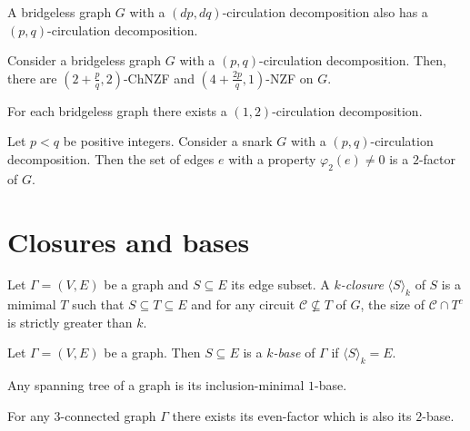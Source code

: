 \begin{lemma}
A bridgeless graph $G$ with a $(dp,dq)$-circulation decomposition also has a $(p,q)$-circulation decomposition.\label{lem:circ_rel_prime}
\end{lemma}

\begin{proposition}
    Consider a bridgeless graph $G$ with a $(p,q)$-circulation decomposition. Then, there are $\left(2+\frac pq,2\right)$-ChNZF and $\left(4+\frac {2p}q, 1\right)$-NZF on $G$.\label{prop:nzf_from_two_circulations_generalised}
\end{proposition}

\begin{conjecture}
    For each bridgeless graph there exists a $(1, 2)$-circulation decomposition.
\end{conjecture}

\begin{lemma}
	Let $p<q$ be positive integers. Consider a snark $G$ with a $(p,q)$-circulation decomposition. Then the set of edges $e$ with a property $\varphi_2(e)\neq 0$ is a $2$-factor of $G$.\label{lem:2_circ_snark_2_factor}
\end{lemma}

\section{Closures and bases}

\begin{definition} \cite[p. 132]{seymour}
	Let $\Gamma=(V,E)$ be a graph and $S\subseteq E$ its edge subset. A \emph{$k$-closure} $\langle S\rangle_{k}$ of $S$ is a mimimal $T$ such that $S\subseteq T\subseteq E$ and for any circuit $\mathcal C\not\subseteq T$ of $G$, the size of $\mathcal C\cap T^c$ is strictly greater than $k$.
\end{definition}

\begin{definition} \cite[p. 7]{group_connectivity_enumeration}
	Let $\Gamma=(V,E)$ be a graph. Then $S\subseteq E$ is a \emph{$k$-base} of $\Gamma$ if $\langle S\rangle_k = E$.
\end{definition}

\begin{claim}
	Any spanning tree of a graph is its inclusion-minimal $1$-base.
\end{claim}

\begin{lemma} \cite[p. 133]{seymour}
	For any $3$-connected graph $\Gamma$ there exists its even-factor which is also its $2$-base.
\end{lemma}

